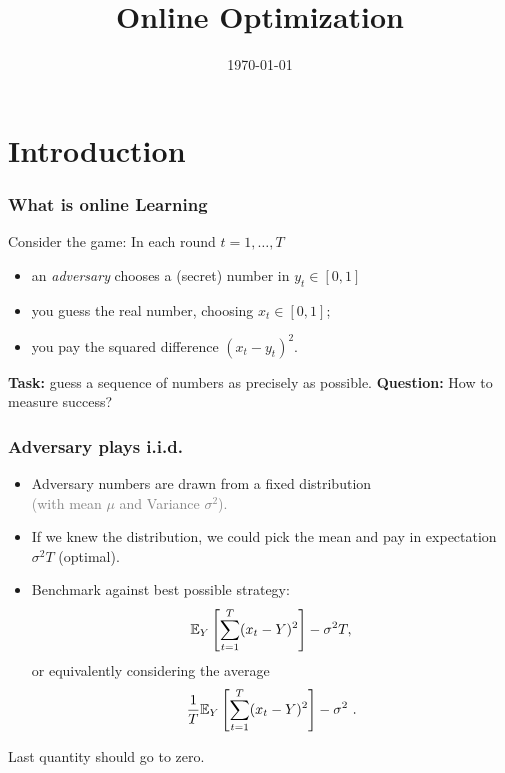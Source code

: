 \documentclass{beamer}
\title{Online Optimization}
\date{\today}
\begin{document}
\maketitle
\frame{\tableofcontents}

\section{Introduction}

\begin{frame}
  \frametitle{What is online Learning}
  Consider the game: In each round $t=1,\dots,T$
  \begin{itemize}
    \item an \textit{adversary} chooses a (secret) number in $y_t \in [0,1]$
    \item you guess the real number, choosing $x_t \in [0,1]$;
    \item you pay the squared difference ${(x_t-y_t)}^2$.
  \end{itemize}
  \medskip
  \textbf{Task:} guess a sequence of numbers as precisely as possible.
  \textbf{Question:} How to measure success?
\end{frame}


\begin{frame}
  \frametitle{Adversary plays i.i.d.}
  \begin{itemize}
    \item Adversary numbers are drawn from a fixed distribution \\
          \textcolor{gray}{(with mean $\mu$ and Variance $\sigma^2$).}
    \item If we knew the distribution, we could pick the mean and pay in expectation $\sigma^2T$ (optimal).
    \item Benchmark against best possible strategy:
          \begin{equation}
            \label{eq:stoch_regret}
            \mathbb{E}_Y\left[\sum_{t=1}^T (x_t - Y)^2\right] - \sigma^2 T,
          \end{equation}
          or equivalently considering the average
          \begin{equation}
            \label{eq:av_stoch_regret}
            \frac{1}{T}\mathbb{E}_Y\left[\sum_{t=1}^T (x_t - Y)^2\right] - \sigma^2~.
          \end{equation}
  \end{itemize}
  Last quantity should go to zero.

\end{frame}
\end{document}
